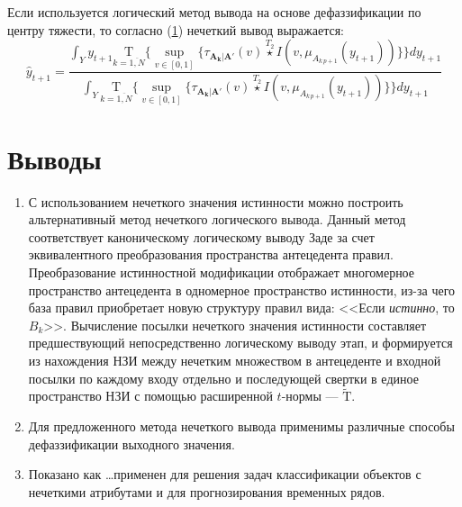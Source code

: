 Если используется логический метод вывода на основе дефаззификации по центру тяжести, то согласно (\ref{}) нечеткий вывод выражается:
\begin{equation}
\hat{y}_{t+1} = \frac{\int_Y y_{t+1} \underset{k=\overline{1,N}}{\textrm{T}}\Biggl\{\sup_{v \in [0,1]}\biggl\{\tau_{\mathbf{A_k}|\mathbf{A'}}(v)\overset{T_2}{\star} I(v, \mu_{A_{k\,p+1}}(y_{t+1}))\biggr\}\Biggr\} dy_{t+1}}{\int_Y \underset{k=\overline{1,N}}{\textrm{T}}\Biggl\{\sup_{v \in [0,1]}\biggl\{\tau_{\mathbf{A_k}|\mathbf{A'}}(v)\overset{T_2}{\star} I(v, \mu_{A_{k\,p+1}}(y_{t+1}))\biggr\}\Biggr\} dy_{t+1}}
\end{equation}



\section{Выводы}

\begin{enumerate}
	\item С использованием нечеткого значения истинности можно построить альтернативный метод нечеткого логического вывода. Данный метод соответствует каноническому логическому выводу Заде за счет эквивалентного преобразования пространства антецедента правил. Преобразование истинностной модификации отображает многомерное пространство антецедента в одномерное пространство истинности, из-за чего база правил приобретает новую структуру правил вида: <<Если \textit{истинно}, то $B_k$>>. Вычисление посылки нечеткого значения истинности составляет предшествующий непосредственно логическому выводу этап, и формируется из нахождения НЗИ между нечетким множеством в антецеденте и входной посылки по каждому входу отдельно и последующей свертки в единое пространство НЗИ с помощью расширенной $t$-нормы --- $\tilde{\mathrm{T}}$.
	\item Для предложенного метода нечеткого вывода применимы различные способы дефаззификации выходного значения.  
	\item Показано как \dots применен для решения задач классификации объектов с нечеткими атрибутами и для прогнозирования временных рядов.
\end{enumerate}

